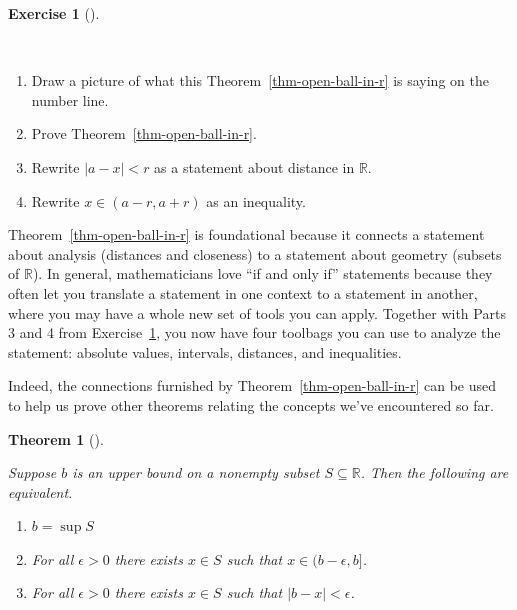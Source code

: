 \documentclass[
  letterpaper,
  DIV=11,
  numbers=noendperiod]{scrreprt}
\providecommand{\tightlist}{%
  \setlength{\itemsep}{0pt}\setlength{\parskip}{0pt}}
\def\R{\mathbb R}
\theoremstyle{plain}
\newtheorem{theorem}{Theorem}[chapter]
\theoremstyle{definition}
\newtheorem{exercise}{Exercise}[chapter]
\theoremstyle{plain}
\theoremstyle{plain}
\theoremstyle{definition}
\theoremstyle{definition}
\theoremstyle{remark}
\begin{document}
\begin{exercise}[]\protect\hypertarget{exr-open-ball-in-r}{}\label{exr-open-ball-in-r}

~

\begin{enumerate}
\def\labelenumi{\arabic{enumi}.}
\tightlist
\item
  Draw a picture of what this Theorem~\ref{thm-open-ball-in-r} is saying
  on the number line.
\item
  Prove Theorem~\ref{thm-open-ball-in-r}.
\item
  Rewrite \(|a-x|<r\) as a statement about distance in \(\R\).
\item
  Rewrite \(x\in(a-r,a+r)\) as an inequality.
\end{enumerate}

\end{exercise}

Theorem~\ref{thm-open-ball-in-r} is foundational because it connects a
statement about analysis (distances and closeness) to a statement about
geometry (subsets of \(\R\)). In general, mathematicians love ``if and
only if'' statements because they often let you translate a statement in
one context to a statement in another, where you may have a whole new
set of tools you can apply. Together with Parts 3 and 4 from
Exercise~\ref{exr-open-ball-in-r}, you now have four toolbags you can
use to analyze the statement: absolute values, intervals, distances, and
inequalities.

Indeed, the connections furnished by Theorem~\ref{thm-open-ball-in-r}
can be used to help us prove other theorems relating the concepts we've
encountered so far.

\begin{theorem}[]\protect\hypertarget{thm-lub-tfae}{}\label{thm-lub-tfae}

Suppose \(b\) is an upper bound on a nonempty subset \(S\subseteq\R\).
Then the following are equivalent.

\begin{enumerate}
\def\labelenumi{\arabic{enumi}.}
\tightlist
\item
  \(b=\sup S\)
\item
  For all \(\epsilon>0\) there exists \(x\in S\) such that
  \(x\in(b-\epsilon,b]\).
\item
  For all \(\epsilon>0\) there exists \(x\in S\) such that
  \(|b-x|<\epsilon\).
\end{enumerate}

\end{theorem}
\end{document}
